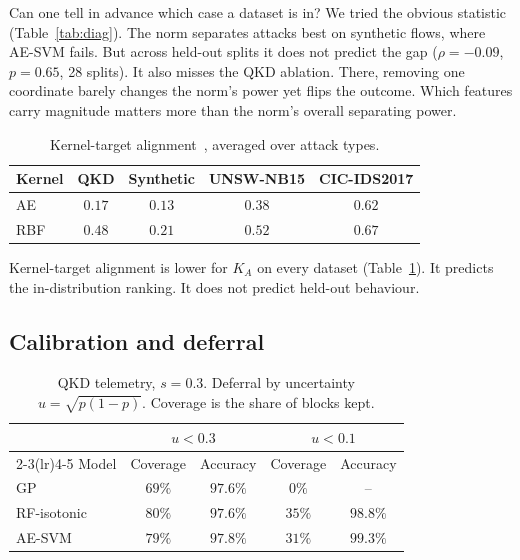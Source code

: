 \documentclass[journal]{IEEEtran}
\begin{document}
Can one tell in advance which case a dataset is in? We tried the obvious
statistic (Table~\ref{tab:diag}). The norm separates attacks best on synthetic
flows, where AE-SVM fails. But across held-out splits it does not predict the
gap ($\rho=-0.09$, $p=0.65$, 28 splits). It also misses the QKD ablation. There, removing one coordinate
barely changes the norm's power yet flips the outcome. Which features carry
magnitude matters more than the norm's overall separating power.

\begin{table}[t]
  \centering
  \caption{Kernel-target alignment~\cite{cristianini2002kernel}, averaged over attack types.}
  \label{tab:align}
  \footnotesize
  \begin{tabular}{lcccc}
    \toprule
    Kernel & QKD & Synthetic & UNSW-NB15 & CIC-IDS2017 \\
    \midrule
    AE & $0.17$ & $0.13$ & $0.38$ & $0.62$ \\
    RBF & $0.48$ & $0.21$ & $0.52$ & $0.67$ \\
    \bottomrule
  \end{tabular}
\end{table}

Kernel-target alignment is lower for $K_A$ on every dataset (Table~\ref{tab:align}).
It predicts the in-distribution ranking. It does not predict held-out behaviour.

\subsection{Calibration and deferral}
\label{sec:res-calib}

\begin{table}[t]
  \centering
  \caption{QKD telemetry, $s=0.3$. Deferral by uncertainty $u=\sqrt{p(1-p)}$. Coverage is the share of blocks kept.}
  \label{tab:select}
  \footnotesize
  \setlength{\tabcolsep}{4pt}
  \begin{tabular}{lcccc}
    \toprule
    & \multicolumn{2}{c}{$u<0.3$} & \multicolumn{2}{c}{$u<0.1$} \\
    \cmidrule(lr){2-3}\cmidrule(lr){4-5}
    Model & Coverage & Accuracy & Coverage & Accuracy \\
    \midrule
    GP & $69\%$ & $97.6\%$ & $0\%$ & -- \\
    RF-isotonic & $80\%$ & $97.6\%$ & $35\%$ & $98.8\%$ \\
    AE-SVM & $79\%$ & $97.8\%$ & $31\%$ & $99.3\%$ \\
    \bottomrule
  \end{tabular}
\end{table}
\end{document}
